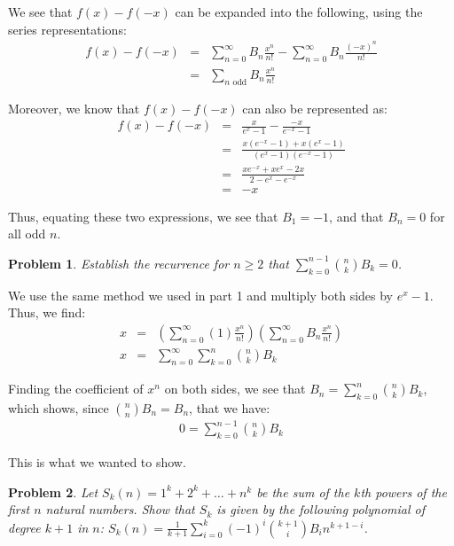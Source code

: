 \documentclass[psamsfonts]{amsart}
\newtheorem{prob}{Problem}[section]
\newenvironment{sol}{{\bfseries Solution}}{\qedsymbol}
\theoremstyle{definition}
\theoremstyle{remark}
\numberwithin{equation}{section}
\begin{document}
\begin{sol}
We see that $f(x) - f(-x)$ can be expanded into the following, using the series representations:
\begin{eqnarray}
f(x) - f(-x) &=& \sum_{n=0}^\infty B_n \frac{x^n}{n!} - \sum_{n=0}^{\infty} B_n \frac{(-x)^n}{n!} \\
&=& \sum_{n \textrm{ odd}} B_n \frac{x^n}{n!} 
\end{eqnarray}

Moreover, we know that $f(x) - f(-x)$ can also be represented as:
\begin{eqnarray}
f(x) - f(-x) &=& \frac{x}{e^x - 1} - \frac{-x}{e^{-x} - 1} \\
&=& \frac{x(e^{-x} - 1) + x(e^{x} - 1)}{(e^{x} - 1)(e^{-x} - 1)} \\
&=& \frac{x e^{-x} + x e^{x} - 2x}{2 - e^x - e^{-x}} \\
&=& -x 
\end{eqnarray}

Thus, equating these two expressions, we see that $B_1 = -1$, and that $B_n = 0$ for all odd $n$. 
\end{sol}

\begin{prob}
Establish the recurrence for $n \geq 2$ that $\sum_{k=0}^{n-1} {n \choose k} B_k = 0$. 
\end{prob}

\begin{sol}
We use the same method we used in part 1 and multiply both sides by $e^x - 1$. Thus, we find:
\begin{eqnarray}
x &=& \left( \sum_{n=0}^\infty (1) \frac{x^n}{n!} \right) \left( \sum_{n=0}^\infty B_n \frac{x^n}{n!} \right) \\
x &=& \sum_{n=0}^\infty \sum_{k=0}^n {n \choose k } B_k 
\end{eqnarray}

Finding the coefficient of $x^n$ on both sides, we see that $B_n = \sum_{k=0}^n {n \choose k} B_k$, which shows, since ${n \choose n} B_n = B_n$, that we have:
\begin{eqnarray}
0 = \sum_{k=0}^{n-1} {n \choose k} B_k 
\end{eqnarray}

This is what we wanted to show.
\end{sol}

\begin{prob}
Let $S_k(n) = 1^k + 2^k + \ldots + n^k$ be the sum of the $k$th powers of the first $n$ natural numbers. Show that $S_k$ is given by the following polynomial of degree $k+1$ in $n$: $S_k(n) = \frac{1}{k+1} \sum_{i=0}^k (-1)^i {k + 1 \choose i} B_i n^{k+1 - i}$. 
\end{prob}
\end{document}
